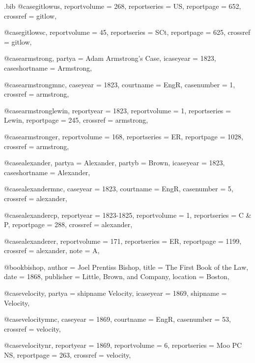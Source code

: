 \begin{filecontents*}{\jobname.bib}
@case{gitlowus,
  reportvolume = {268},
  reportseries = {US},
  reportpage = {652},
  crossref = {gitlow},
}


@case{gitlowsc,
  reportvolume = {45},
  reportseries = {SCt},
  reportpage = {625},
  crossref = {gitlow},
}

@case{armstrong,
  partya = {Adam Armstrong's Case},
  icaseyear = {1823},
  caseshortname = {Armstrong},
	}

@case{armstrongmnc,
  caseyear = {1823},
  courtname = {EngR},
  casenumber = {1},
  crossref = {armstrong},
}


@case{armstronglewin,
  reportyear = {1823},
  reportvolume = {1},
  reportseries = {Lewin},
  reportpage = {245},
  crossref = {armstrong},
}

@case{armstronger,
  reportvolume = {168},
  reportseries = {ER},
  reportpage = {1028},
  crossref = {armstrong},
}




@case{alexander,
  partya = {Alexander},
  partyb = {Brown},
  icaseyear = {1823},
  caseshortname = {Alexander},
	}

@case{alexandermnc,
  caseyear = {1823},
  courtname = {EngR},
  casenumber = {5},
  crossref = {alexander},
}


@case{alexandercp,
  reportyear = {1823-1825},
  reportvolume = {1},
  reportseries = {C \& P},
  reportpage = {288},
  crossref = {alexander},
}

@case{alexanderer,
  reportvolume = {171},
  reportseries = {ER},
  reportpage = {1199},
  crossref = {alexander},
  note = {A},
}




@book{bishop,
author = {Joel Prentiss Bishop},
title = {The First Book of the Law},
date = {1868},
publisher = {Little, Brown, and Company},
location = {Boston},
}


@case{velocity,
  partya = {shipname Velocity},
  icaseyear = {1869},
  shipname = {Velocity},
	}

@case{velocitymnc,
  caseyear = {1869},
  courtname = {EngR},
  casenumber = {53},
  crossref = {velocity},
}


@case{velocitynr,
  reportyear = {1869},
  reportvolume = {6},
  reportseries = {Moo PC NS},
  reportpage = {263},
  crossref = {velocity},
}


\end{filecontents*}
